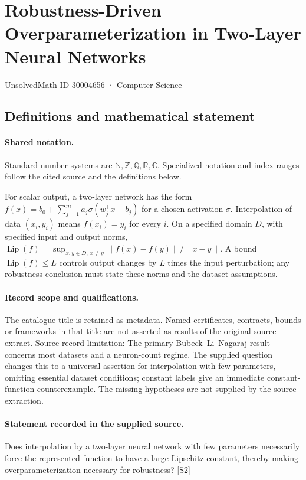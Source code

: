 \documentclass[11pt]{article}
\newcommand{\sref}[2]{\hyperlink{source:#1:#2}{[S#2]}}
\begin{document}
\setcounter{section}{30004655}
\section{Robustness-Driven Overparameterization in Two-Layer Neural Networks}\label{30004656}
{\small\sffamily UnsolvedMath ID 30004656 · Computer Science}
\subsection{Definitions and mathematical statement}

\paragraph{Shared notation.}Standard number systems are $\mathbb N,\mathbb Z,\mathbb Q,\mathbb R,\mathbb C$. Specialized notation and index ranges follow the cited source and the definitions below.


For scalar output, a two-layer network has the form $f(x)=b_0+\sum_{j=1}^m a_j\sigma(w_j^{\mathsf T}x+b_j)$ for a chosen activation $\sigma$. Interpolation of data $(x_i,y_i)$ means $f(x_i)=y_i$ for every $i$. On a specified domain $D$, with specified input and output norms, $\operatorname{Lip}(f)=\sup_{x,y\in D,\,x\ne y}\|f(x)-f(y)\|/\|x-y\|$. A bound $\operatorname{Lip}(f)\le L$ controls output changes by $L$ times the input perturbation; any robustness conclusion must state these norms and the dataset assumptions.
\paragraph{Record scope and qualifications.}
The catalogue title is retained as metadata. Named certificates, contracts, bounds or frameworks in that title are not asserted as results of the original source extract.
Source-record limitation: The primary Bubeck--Li--Nagaraj result concerns most datasets and a neuron-count regime. The supplied question changes this to a universal assertion for interpolation with few parameters, omitting essential dataset conditions; constant labels give an immediate constant-function counterexample. The missing hypotheses are not supplied by the source extraction.
\paragraph{Statement recorded in the supplied source.}
Does interpolation by a two-layer neural network with few parameters necessarily force the represented function to have a large Lipschitz constant, thereby making overparameterization necessary for robustness? \sref{30004656}{2}
\end{document}
